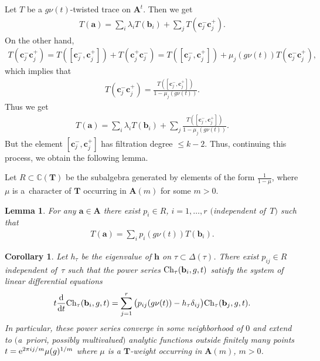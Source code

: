 \documentclass[pdftex]{sigma}
\numberwithin{equation}{section}
\newtheorem{Corollary}[Theorem]{Corollary}
\newtheorem{Lemma}[Theorem]{Lemma}
\begin{document}
Let $T$ be a $g\nu(t)$-twisted trace on ${\mathbf A}^t$. Then we get
\begin{gather*}
T({\mathbf a})=\sum_i \lambda_iT({\mathbf b}_i)+\sum_j T({\mathbf c}_j^-{\mathbf c}_j^+).
\end{gather*}
On the other hand,
\begin{gather*}
T({\mathbf c}_j^-{\mathbf c}_j^+)=T([{\mathbf c}_j^-,{\mathbf c}_j^+])+T({\mathbf c}_j^+{\mathbf c}_j^-)=
T([{\mathbf c}_j^-,{\mathbf c}_j^+])+\mu_j(g\nu(t))T({\mathbf c}_j^-{\mathbf c}_j^+),
\end{gather*}
which implies that
\begin{gather*}
T({\mathbf c}_j^-{\mathbf c}_j^+)=\frac{T([{\mathbf c}_j^-,{\mathbf c}_j^+])}{1-\mu_j(g\nu(t))}.
\end{gather*}
Thus we get
\begin{gather*}
T({\mathbf a})=\sum_i \lambda_iT({\mathbf b}_i)+\sum_j \frac{T([{\mathbf c}_j^-,{\mathbf c}_j^+])}{1-\mu_j(g\nu(t))}.
\end{gather*}
But the element $[{\mathbf c}_j^-,{\mathbf c}_j^+]$ has filtration degree $\le k-2$. Thus, continuing this process,
we obtain the following lemma.

Let $R\subset {\mathbb C}({\mathbf T})$ be the subalgebra generated by elements of the form $\frac{1}{1-\mu}$, where $\mu$ is a~character of ${\mathbf T}$ occurring in ${\mathbf A}(m)$ for some $m>0$.

\begin{Lemma}\label{normfor}
For any ${\mathbf a}\in {\mathbf A}$ there exist $p_i\in R$, $i=1,\dots,r$ $($independent of~$T)$ such that
\begin{gather*}
T({\mathbf a})=\sum_i p_i(g\nu(t))T({\mathbf b}_i).
\end{gather*}
\end{Lemma}

\begin{Corollary} \label{normfor1} Let $h_\tau$ be the eigenvalue of ${\mathbf{h}}$ on $\tau\subset \Delta(\tau)$. There exist $p_{ij}\in R$ independent of~$\tau$ such that the power series ${\rm Ch}_\tau({\mathbf b}_i,g,t)$ satisfy the system of linear differential equations
\begin{gather*}
t\frac{{\rm d}}{{\rm d}t}{\rm Ch}_\tau({\mathbf b}_i,g,t)=\sum_{j=1}^r \big(p_{ij}(g\nu(t))-h_\tau \delta_{ij}\big){\rm Ch}_\tau({\mathbf b}_j,g,t).
\end{gather*}
In particular, these power series converge in some neighborhood of $0$ and extend to $($a~priori, possibly multivalued$)$ analytic functions outside finitely many points $t={\rm e}^{2\pi ij/m}\mu(g)^{1/m}$ where $\mu$ is a ${\mathbf T}$-weight occurring in ${\mathbf A}(m)$, $m>0$.
\end{Corollary}
\end{document}
